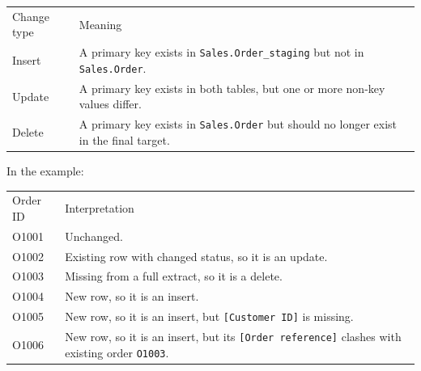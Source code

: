 \documentclass[10pt,openany,10pt]{book}
\newcounter{none}
\let\podeToprule\toprule
\let\podeMidrule\midrule
\let\podeBottomrule\bottomrule
\renewcommand{\toprule}{\arrayrulecolor{pbiGrid}\podeToprule}
\renewcommand{\midrule}{\arrayrulecolor{pbiGrid}\podeMidrule}
\renewcommand{\bottomrule}{\arrayrulecolor{pbiGrid}\podeBottomrule}
\begin{document}
{\def\LTcaptype{none} %
\begin{longtable}[]{@{}
  >{\raggedright\arraybackslash}p{}
  >{\raggedright\arraybackslash}p{}@{}}
\toprule\noalign{}
\begin{minipage}[b]{\linewidth}\raggedright
Change type
\end{minipage} & \begin{minipage}[b]{\linewidth}\raggedright
Meaning
\end{minipage} \\
\midrule\noalign{}
\endhead
\bottomrule\noalign{}
\endlastfoot
Insert & A primary key exists in \texttt{Sales.Order\_staging} but not
in \texttt{Sales.Order}. \\
Update & A primary key exists in both tables, but one or more non-key
values differ. \\
Delete & A primary key exists in \texttt{Sales.Order} but should no
longer exist in the final target. \\
\end{longtable}
}

In the example:

{\def\LTcaptype{none} %
\begin{longtable}[]{@{}
  >{\raggedright\arraybackslash}p{}
  >{\raggedright\arraybackslash}p{}@{}}
\toprule\noalign{}
\begin{minipage}[b]{\linewidth}\raggedright
Order ID
\end{minipage} & \begin{minipage}[b]{\linewidth}\raggedright
Interpretation
\end{minipage} \\
\midrule\noalign{}
\endhead
\bottomrule\noalign{}
\endlastfoot
O1001 & Unchanged. \\
O1002 & Existing row with changed status, so it is an update. \\
O1003 & Missing from a full extract, so it is a delete. \\
O1004 & New row, so it is an insert. \\
O1005 & New row, so it is an insert, but \texttt{{[}Customer\ ID{]}} is
missing. \\
O1006 & New row, so it is an insert, but its
\texttt{{[}Order\ reference{]}} clashes with existing order
\texttt{O1003}. \\
\end{longtable}
}
\end{document}
